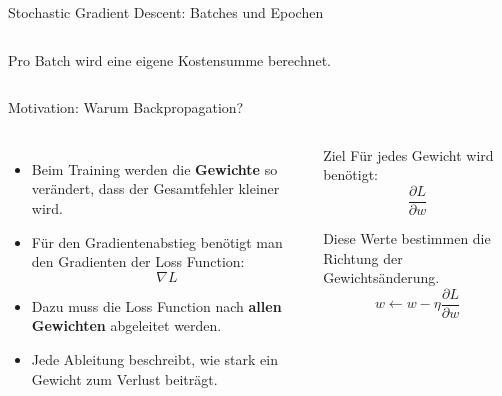 \begin{frame}{Stochastic Gradient Descent: Batches und Epochen}
\begin{columns}
{%
}

\vspace{0.2cm}

{\scriptsize Pro Batch wird eine eigene Kostensumme berechnet.}

\end{columns}

\end{frame}


\begin{frame}{Motivation: Warum Backpropagation?}

\begin{columns}

\begin{itemize}
    \item Beim Training werden die \textbf{Gewichte} so verändert, dass der
          Gesamtfehler kleiner wird.

    \item Für den Gradientenabstieg benötigt man den Gradienten der
          Loss Function:
          \[
              \nabla L
          \]

    \item Dazu muss die Loss Function nach \textbf{allen Gewichten}
          abgeleitet werden.

    \item Jede Ableitung beschreibt, wie stark ein Gewicht zum Verlust beiträgt.
\end{itemize}


\begin{blockC1}{Ziel}
Für jedes Gewicht wird benötigt:
\[
    \frac{\partial L}{\partial w}
\]

\vspace{0.3cm}

Diese Werte bestimmen die Richtung der Gewichtsänderung.
\[
    w \leftarrow w - \eta \frac{\partial L}{\partial w}
\]
\end{blockC1}

\end{columns}
\end{frame}

